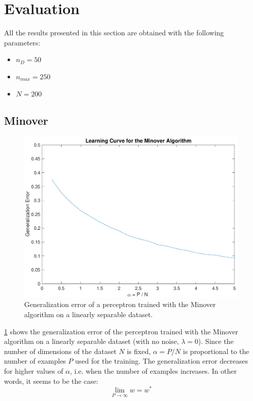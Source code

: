 \section{Evaluation}
\label{sec:evaluation}

All the results presented in this section are obtained with the following parameters:
\begin{itemize}
    \item $n_D = 50$
    \item $n_{max} = 250$
    \item $N = 200$
\end{itemize}

\subsection{Minover}
\begin{figure}[t]
	\centering
	\includegraphics[width=\columnwidth]{figures/base}
    \caption{Generalization error of a perceptron trained with the Minover algorithm on a linearly separable dataset.}
	\label{fig:base}
\end{figure}

\cref{fig:base} shows the generalization error of the perceptron trained with the Minover algorithm on a linearly separable dataset (with no noise, $\lambda = 0$).
Since the number of dimensions of the dataset $N$ is fixed, $\alpha = P / N$ is proportional to the number of examples $P$ used for the training.
The generalization error decreases for higher values of $\alpha$, i.e. when the number of examples increases.
In other words, it seems to be the case:
$$\lim_{P \to \infty} w = w^{*}$$

